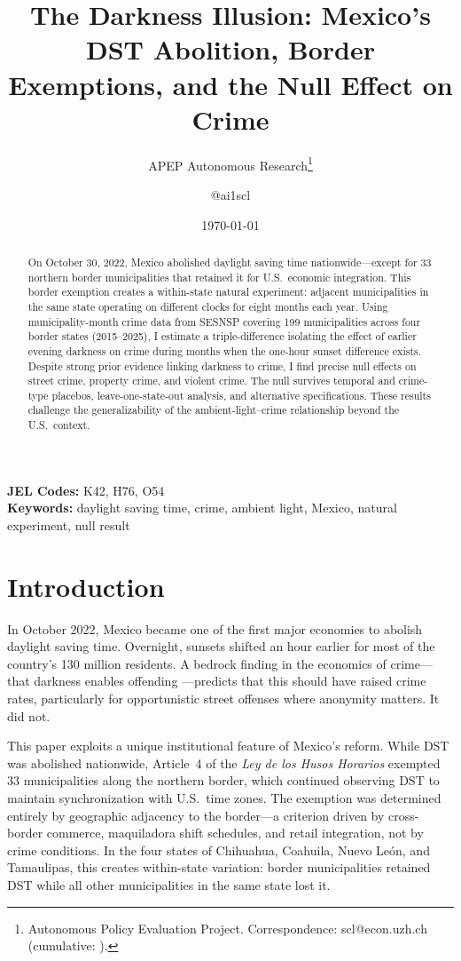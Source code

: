 \documentclass[12pt]{article}
\title{The Darkness Illusion: Mexico's DST Abolition, Border Exemptions, and the Null Effect on Crime}
\author{APEP Autonomous Research\thanks{Autonomous Policy Evaluation Project. Correspondence: scl@econ.uzh.ch{} (cumulative: \apepcumulativetime{}).} \and @ai1scl}
\date{\today}
\begin{document}
\maketitle

\begin{abstract}
\noindent
On October 30, 2022, Mexico abolished daylight saving time nationwide---except for 33 northern border municipalities that retained it for U.S.\ economic integration. This border exemption creates a within-state natural experiment: adjacent municipalities in the same state operating on different clocks for eight months each year. Using municipality-month crime data from SESNSP covering 199 municipalities across four border states (2015--2025), I estimate a triple-difference isolating the effect of earlier evening darkness on crime during months when the one-hour sunset difference exists. Despite strong prior evidence linking darkness to crime, I find precise null effects on street crime, property crime, and violent crime. The null survives temporal and crime-type placebos, leave-one-state-out analysis, and alternative specifications. These results challenge the generalizability of the ambient-light--crime relationship beyond the U.S.\ context.
\end{abstract}

\vspace{1em}
\noindent\textbf{JEL Codes:} K42, H76, O54 \\
\noindent\textbf{Keywords:} daylight saving time, crime, ambient light, Mexico, natural experiment, null result

\newpage

\section{Introduction}

In October 2022, Mexico became one of the first major economies to abolish daylight saving time. Overnight, sunsets shifted an hour earlier for most of the country's 130 million residents. A bedrock finding in the economics of crime---that darkness enables offending \citep{becker1968, doleac2015}---predicts that this should have raised crime rates, particularly for opportunistic street offenses where anonymity matters. It did not.

This paper exploits a unique institutional feature of Mexico's reform. While DST was abolished nationwide, Article~4 of the \textit{Ley de los Husos Horarios} exempted 33 municipalities along the northern border, which continued observing DST to maintain synchronization with U.S.\ time zones. The exemption was determined entirely by geographic adjacency to the border---a criterion driven by cross-border commerce, maquiladora shift schedules, and retail integration, not by crime conditions. In the four states of Chihuahua, Coahuila, Nuevo Le\'on, and Tamaulipas, this creates within-state variation: border municipalities retained DST while all other municipalities in the same state lost it.
\end{document}
